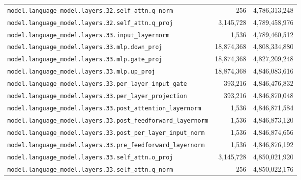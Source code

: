 \documentclass[10pt,a4paper]{article}
\theoremstyle{definition}
\begin{document}
\begin{appendices}
\begin{longtable}{p{9.5cm}rr}
\texttt{model.\allowbreak{}language\_model.\allowbreak{}layers.\allowbreak{}32.\allowbreak{}self\_attn.\allowbreak{}q\_norm} & 256 & 4,786,313,248 \\
\texttt{model.\allowbreak{}language\_model.\allowbreak{}layers.\allowbreak{}32.\allowbreak{}self\_attn.\allowbreak{}q\_proj} & 3,145,728 & 4,789,458,976 \\
\texttt{model.\allowbreak{}language\_model.\allowbreak{}layers.\allowbreak{}33.\allowbreak{}input\_layernorm} & 1,536 & 4,789,460,512 \\
\texttt{model.\allowbreak{}language\_model.\allowbreak{}layers.\allowbreak{}33.\allowbreak{}mlp.\allowbreak{}down\_proj} & 18,874,368 & 4,808,334,880 \\
\texttt{model.\allowbreak{}language\_model.\allowbreak{}layers.\allowbreak{}33.\allowbreak{}mlp.\allowbreak{}gate\_proj} & 18,874,368 & 4,827,209,248 \\
\texttt{model.\allowbreak{}language\_model.\allowbreak{}layers.\allowbreak{}33.\allowbreak{}mlp.\allowbreak{}up\_proj} & 18,874,368 & 4,846,083,616 \\
\texttt{model.\allowbreak{}language\_model.\allowbreak{}layers.\allowbreak{}33.\allowbreak{}per\_layer\_input\_gate} & 393,216 & 4,846,476,832 \\
\texttt{model.\allowbreak{}language\_model.\allowbreak{}layers.\allowbreak{}33.\allowbreak{}per\_layer\_projection} & 393,216 & 4,846,870,048 \\
\texttt{model.\allowbreak{}language\_model.\allowbreak{}layers.\allowbreak{}33.\allowbreak{}post\_attention\_layernorm} & 1,536 & 4,846,871,584 \\
\texttt{model.\allowbreak{}language\_model.\allowbreak{}layers.\allowbreak{}33.\allowbreak{}post\_feedforward\_layernorm} & 1,536 & 4,846,873,120 \\
\texttt{model.\allowbreak{}language\_model.\allowbreak{}layers.\allowbreak{}33.\allowbreak{}post\_per\_layer\_input\_norm} & 1,536 & 4,846,874,656 \\
\texttt{model.\allowbreak{}language\_model.\allowbreak{}layers.\allowbreak{}33.\allowbreak{}pre\_feedforward\_layernorm} & 1,536 & 4,846,876,192 \\
\texttt{model.\allowbreak{}language\_model.\allowbreak{}layers.\allowbreak{}33.\allowbreak{}self\_attn.\allowbreak{}o\_proj} & 3,145,728 & 4,850,021,920 \\
\texttt{model.\allowbreak{}language\_model.\allowbreak{}layers.\allowbreak{}33.\allowbreak{}self\_attn.\allowbreak{}q\_norm} & 256 & 4,850,022,176 \\

\end{longtable}
\end{appendices}
\end{document}
